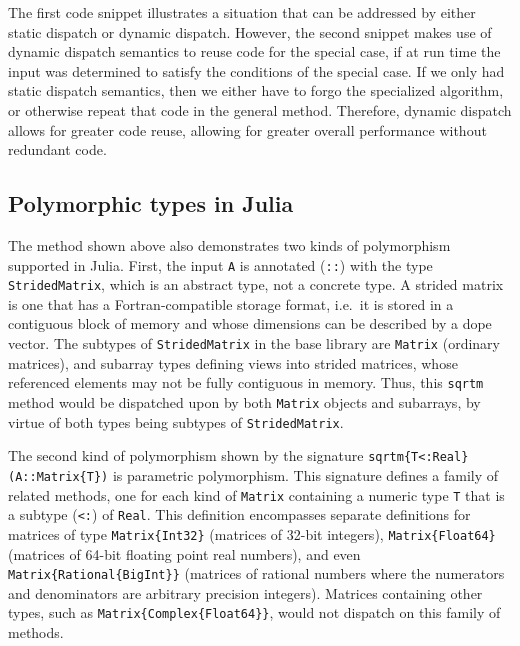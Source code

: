 The first code snippet illustrates a situation that can be addressed by either
static dispatch or dynamic dispatch. However, the second snippet makes use of
dynamic dispatch semantics to reuse code for the special case, if at run time
the input was determined to satisfy the conditions of the special case. If we
only had static dispatch semantics, then we either have to forgo the
specialized algorithm, or otherwise repeat that code in the general method.
Therefore, dynamic dispatch allows for greater code reuse, allowing for greater
overall performance without redundant code.



\subsection{Polymorphic types in Julia}

The method shown above also demonstrates two kinds of polymorphism supported in
Julia. First, the input \lstinline|A| is annotated (\lstinline|::|) with the
type \lstinline|StridedMatrix|, which is an abstract type, not a concrete type.
A strided matrix is one that has a Fortran-compatible storage format, i.e.\ it
is stored in a contiguous block of memory and whose dimensions can be described
by a dope vector. The subtypes of \lstinline|StridedMatrix| in the base
library are \lstinline|Matrix| (ordinary matrices), and subarray types defining
views into strided matrices, whose referenced elements may not be fully
contiguous in memory. Thus, this \lstinline|sqrtm| method would be
dispatched upon by both \lstinline|Matrix| objects and subarrays, by virtue of
both types being subtypes of \lstinline|StridedMatrix|.

The second kind of polymorphism shown by the signature
\lstinline|sqrtm{T<:Real}(A::Matrix{T})| is parametric polymorphism. This
signature defines a family of related methods, one for each kind of
\lstinline|Matrix| containing a numeric type \lstinline|T| that is a subtype
(\lstinline|<:|) of \lstinline|Real|. This definition encompasses separate
definitions for matrices of type \lstinline|Matrix{Int32}| (matrices of 32-bit
integers), \lstinline|Matrix{Float64}| (matrices of 64-bit floating point real
numbers), and even \lstinline|Matrix{Rational{BigInt}}| (matrices of rational
numbers where the numerators and denominators are arbitrary precision
integers). Matrices containing other types, such as
\lstinline|Matrix{Complex{Float64}}|, would not dispatch on this family of methods.

